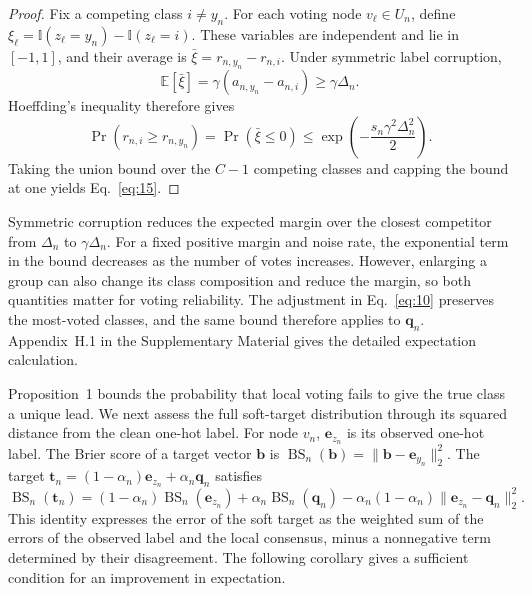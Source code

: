 \documentclass[10pt,letterpaper,nopreprintline]{elsarticle}
\theoremstyle{definition}
\theoremstyle{plain}
\begin{document}
\begin{proof}
\renewcommand{\qedsymbol}{}
Fix a competing class \(i\ne y_n\). For each voting node \(v_\ell\in U_n\), define \(\xi_\ell=\mathbb I(z_\ell=y_n)-\mathbb I(z_\ell=i)\). These variables are independent and lie in \([-1,1]\), and their average is \(\bar\xi=r_{n,y_n}-r_{n,i}\). Under symmetric label corruption,
\[
\mathbb E[\bar\xi]=\gamma(a_{n,y_n}-a_{n,i})\geq\gamma\Delta_n.
\]
Hoeffding's inequality \cite{hoeffding1963} therefore gives
\[
\Pr\!\left(r_{n,i}\geq r_{n,y_n}\right)=\Pr(\bar\xi\leq0)
\leq\exp\!\left(-\frac{s_n\gamma^2\Delta_n^2}{2}\right).
\]
Taking the union bound over the \(C-1\) competing classes and capping the bound at one yields Eq.~\eqref{eq:15}.
\end{proof}

Symmetric corruption reduces the expected margin over the closest competitor from \(\Delta_n\) to \(\gamma\Delta_n\). For a fixed positive margin and noise rate, the exponential term in the bound decreases as the number of votes increases. However, enlarging a group can also change its class composition and reduce the margin, so both quantities matter for voting reliability. The adjustment in Eq.~\eqref{eq:10} preserves the most-voted classes, and the same bound therefore applies to \(\mathbf q_n\). Appendix~H.1 in the Supplementary Material gives the detailed expectation calculation.

\Needspace{100pt}
Proposition~1 bounds the probability that local voting fails to give the true class a unique lead. We next assess the full soft-target distribution through its squared distance from the clean one-hot label. For node \(v_n\), \(\mathbf e_{z_n}\) is its observed one-hot label. The Brier score of a target vector \(\mathbf b\) is \(\operatorname{BS}_n(\mathbf b)=\|\mathbf b-\mathbf e_{y_n}\|_2^2\). The target \(\mathbf t_n=(1-\alpha_n)\mathbf e_{z_n}+\alpha_n\mathbf q_n\) satisfies
\begin{equation}\label{eq:16}
\operatorname{BS}_n(\mathbf t_n)=(1-\alpha_n)\operatorname{BS}_n(\mathbf e_{z_n})+\alpha_n\operatorname{BS}_n(\mathbf q_n)-\alpha_n(1-\alpha_n)\|\mathbf e_{z_n}-\mathbf q_n\|_2^2.
\end{equation}
This identity expresses the error of the soft target as the weighted sum of the errors of the observed label and the local consensus, minus a nonnegative term determined by their disagreement. The following corollary gives a sufficient condition for an improvement in expectation.
\end{document}
